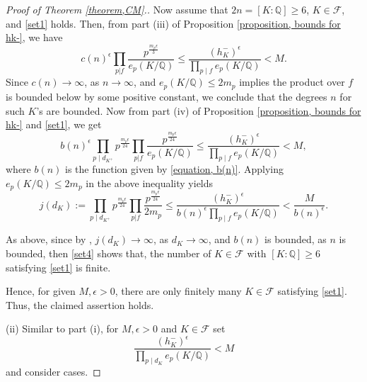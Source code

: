 \documentclass[12pt]{amsart}
\theoremstyle{definition}
\numberwithin{equation}{section}
\begin{document}
\begin{proof}[Proof of Theorem \ref{theorem,CM}.]
Now assume that $2n=[K:\mathbb{Q}] \geq 6$, $K \in \mathcal{F}$, and \eqref{set1} holds.
Then, from part (iii) of Proposition \ref{proposition, bounds for hk-}, we have
\begin{equation*}
c(n)^{\epsilon} \prod_{p | f} \frac{p^{\frac{m_p \epsilon}{3}}}{e_p(K/\mathbb{Q})} \leq \frac{(h_K^-)^{\epsilon}}{\prod_{p \mid f} e_p(K/\mathbb{Q})} < M.
\end{equation*}
Since $c(n) \rightarrow \infty$, as $n \rightarrow \infty$, and $e_p(K/\mathbb{Q})\leq 2m_p$ implies the product over $f$ is bounded below by some positive constant, we conclude that the degrees $n$ for such $K$'s are bounded. Now from part (iv) of Proposition \ref{proposition, bounds for hk-} and \eqref{set1}, we get
\begin{equation*}
b(n)^{\epsilon} \prod_{p \mid d_{K^+}} p^{\frac{ m_p \epsilon}{{24}}} \prod_{p | f} \frac{p^{\frac{m_p \epsilon}{24}}}{e_p(K/\mathbb{Q})} \leq \frac{(h_K^-)^{\epsilon}}{\prod_{p \mid f} e_p(K/\mathbb{Q})} < M,
\end{equation*}
 where $b(n)$ is the function given by \eqref{equation, b(n)}.
Applying $e_p(K/\mathbb{Q})\leq 2m_p$ in  the above inequality yields
\begin{equation}\label{set4}
j(d_K):=  \prod_{p \mid d_{K^+}} p^{\frac{ m_p \epsilon}{{ 24}}} \prod_{p | f} \frac{p^{\frac{m_p \epsilon}{24}}}{2 m_p} \leq \frac{(h_K^-)^{\epsilon}}{b(n)^{\epsilon}\prod_{p \mid f} e_p(K/\mathbb{Q})} < \frac{M}{b(n)^{\epsilon}}.
\end{equation} 


As above, since by \cite[Theorem 316]{Hardy}, $j(d_K) \rightarrow \infty$, as $d_K\rightarrow \infty$, and  $b(n)$ is bounded, as $n$ is bounded, then \eqref{set4} shows that, the number of $K \in \mathcal{F}$ with $[K:\mathbb{Q}]\geq 6$ satisfying \eqref{set1} is finite. 

Hence, for given $M,\epsilon >0$, there are only finitely many $K \in \mathcal{F}$ satisfying \eqref{set1}. Thus, the claimed assertion holds.


(ii) Similar to part (i), for $M, \epsilon >0$ and  $K \in \mathcal{F}$ set
\begin{equation}
\label{set5}
\frac{(h_K^-)^{\epsilon}}{\prod_{p \mid d_K}e_p(K/\mathbb{Q})} < M
\end{equation}
and consider cases.




\end{proof}
\end{document}
